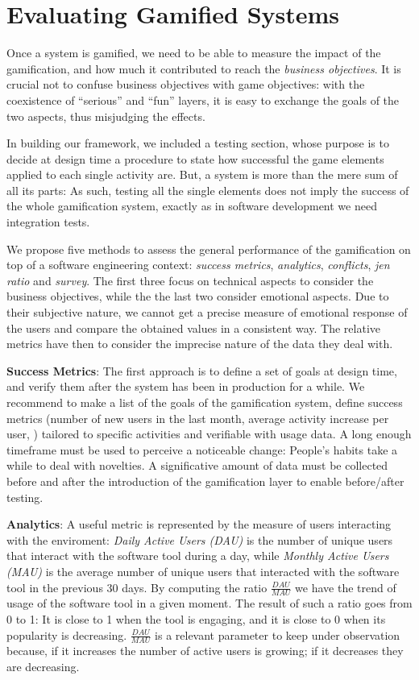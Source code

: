 \section{Evaluating Gamified Systems}

Once a system is gamified, we need to be able to measure the impact of the gamification, and how much it contributed to reach the {\em business objectives}.
It is crucial not to confuse business objectives with game objectives: with the coexistence of ``serious'' and ``fun'' layers, it is easy to exchange the goals of the two aspects, thus misjudging the effects.

In building our framework, we included a testing section, whose purpose is to decide at design time a procedure to state how successful the game elements applied to each single activity are.
But, a system is more than the mere sum of all its parts: As such, testing all the single elements does not imply the success of the whole gamification system, exactly as in software development we need integration tests.

We propose five methods to assess the general performance of the gamification on top of a software engineering context: \emph{success metrics}, \emph{analytics}, \emph{conflicts}, \emph{jen ratio} and \emph{survey}.
The first three focus on technical aspects to consider the business objectives, while the the last two consider emotional aspects.
Due to their subjective nature, we cannot get a precise measure of emotional response of the users and compare the obtained values in a consistent way.
The relative metrics have then to consider the imprecise nature of the data they deal with.

\textbf{Success Metrics}: The first approach is to define a set of goals at design time, and verify them after the system has been in production for a while.
We recommend to make a list of the goals of the gamification system, define success metrics (number of new users in the last month, average activity increase per user, \etc) tailored to specific activities and verifiable with usage data.
A long enough timeframe must be used to perceive a noticeable change: People's habits take a while to deal with novelties.
A significative amount of data must be collected before and after the introduction of the gamification layer to enable before/after testing.

\textbf{Analytics}: A useful metric is represented by the measure of users interacting with the enviroment: \emph{Daily Active Users (DAU)} is the number of unique users that interact with the software tool during a day, while \emph{Monthly Active Users (MAU)} is the average number of unique users that interacted with the software tool in the previous 30 days.
By computing the ratio $\frac{\textit{DAU}}{\textit{MAU}}$ we have the trend of usage of the software tool in a given moment.
The result of such a ratio goes from 0 to 1: It is close to 1 when the tool is engaging, and it is close to 0 when its popularity is decreasing.
$\frac{\textit{DAU}}{\textit{MAU}}$ is a relevant parameter to keep under observation because, if it increases the number of active users is growing; if it decreases they are decreasing.


